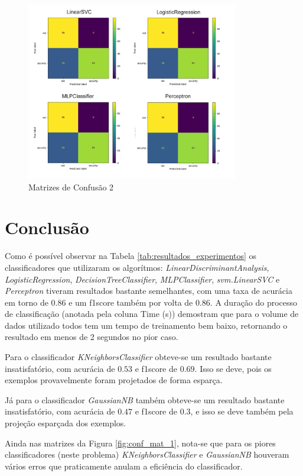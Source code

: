 \documentclass[conference]{IEEEtran}
\begin{document}
\begin{figure}[htbp]
    \centerline{\includegraphics[width=25em]{images/conf_mat_2.png}}
    \caption{Matrizes de Confusão 2}
    \label{fig:conf_mat_2}
\end{figure}

\section{Conclusão}

Como é possível observar na Tabela \ref{tab:resultados_experimentos} os classificadores que utilizaram os algorítmos: \textit{LinearDiscriminantAnalysis}, \textit{LogisticRegression}, \textit{DecisionTreeClassifier}, \textit{MLPClassifier}, \textit{svm.LinearSVC} e \textit{Perceptron} tiveram resultados bastante semelhantes, com uma taxa de acurácia em torno de $0.86$ e um f1score também por volta de $0.86$. A duração do processo de classificação (anotada pela coluna Time (s)) demostram que para o volume de dados utilizado todos tem um tempo de treinamento bem baixo, retornando o resultado em menos de 2 segundos no pior caso.

Para o classificador \textit{KNeighborsClassifier} obteve-se um resultado bastante insatisfatório, com acurácia de $0.53$ e f1score de $0.69$. Isso se deve, pois os exemplos provavelmente foram projetados de forma esparça.

Já para o classificador \textit{GaussianNB} também obteve-se um resultado bastante insatisfatório, com acurácia de $0.47$ e f1score de $0.3$, e isso se deve também pela projeção esparçada dos exemplos.

Ainda nas matrizes da Figura \ref{fig:conf_mat_1}, nota-se que para os piores classificadores (neste problema) \textit{KNeighborsClassifier} e \textit{GaussianNB} houveram vários erros que praticamente anulam a eficiência do classificador.
\end{document}
